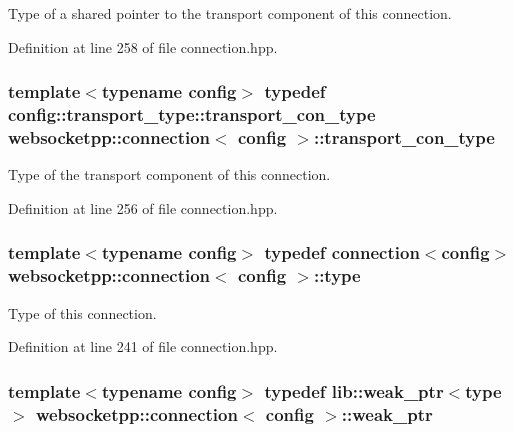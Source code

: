Type of a shared pointer to the transport component of this connection. 



Definition at line 258 of file connection.\+hpp.

\hypertarget{classwebsocketpp_1_1connection_a1deb19aef8e7bde8f955ef5f952c9d19}{}
\subsubsection[{transport\+\_\+con\+\_\+type}]{\setlength{\rightskip}{0pt plus 5cm}template$<$typename config$>$ typedef config\+::transport\+\_\+type\+::transport\+\_\+con\+\_\+type {\bf websocketpp\+::connection}$<$ config $>$\+::{\bf transport\+\_\+con\+\_\+type}}\label{classwebsocketpp_1_1connection_a1deb19aef8e7bde8f955ef5f952c9d19}


Type of the transport component of this connection. 



Definition at line 256 of file connection.\+hpp.

\hypertarget{classwebsocketpp_1_1connection_a6d09aefdf1e35c0169b26ab92a4dee34}{}
\subsubsection[{type}]{\setlength{\rightskip}{0pt plus 5cm}template$<$typename config$>$ typedef {\bf connection}$<$config$>$ {\bf websocketpp\+::connection}$<$ config $>$\+::{\bf type}}\label{classwebsocketpp_1_1connection_a6d09aefdf1e35c0169b26ab92a4dee34}


Type of this connection. 



Definition at line 241 of file connection.\+hpp.

\hypertarget{classwebsocketpp_1_1connection_ac2905dcf6418c52ec9685f9f59b86e3e}{}
\subsubsection[{weak\+\_\+ptr}]{\setlength{\rightskip}{0pt plus 5cm}template$<$typename config$>$ typedef lib\+::weak\+\_\+ptr$<${\bf type}$>$ {\bf websocketpp\+::connection}$<$ config $>$\+::{\bf weak\+\_\+ptr}}\label{classwebsocketpp_1_1connection_ac2905dcf6418c52ec9685f9f59b86e3e}


